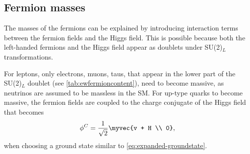 



\subsection{Fermion masses}
\label{subsec:fermion-masses}
The masses of the fermions can be explained by introducing interaction terms between the fermion fields and the Higgs field. 
This is possible because both the left-handed fermions and the Higgs field appear as doublets under SU(2)$_L$ transformations.

For leptons, only electrons, muons, taus, that appear in the lower part of the SU(2)$_L$ doublet (see \cref{tab:ewfermioncontent}), need to become massive, as neutrinos are assumed to be massless in the SM.
For up-type quarks to become massive, the fermion fields are coupled to the charge conjugate of the Higgs field that becomes
\begin{equation}
  \phi^C = \frac{1}{\sqrt{2}} \myvec{v + H \\ 0},
\end{equation}
when choosing a ground state similar to \cref{eq:expanded-groundstate}.

